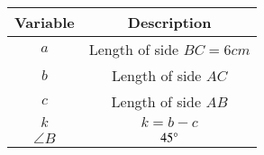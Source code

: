 \begin{tabular}[15pt]{ |c| c|}
    \hline
    \textbf{Variable} & \textbf{Description}\\ 
    \hline
    $a$ & Length of side $BC=6cm$ \\
    \hline 
    $b$ & Length of side $AC$ \\
	\hline
    $c$ & Length of side $AB$ \\
    \hline
	$k$ & $k=b-c$ \\
	\hline
	$\angle B$ & $45\degree$\\
	\hline
    \end{tabular}
